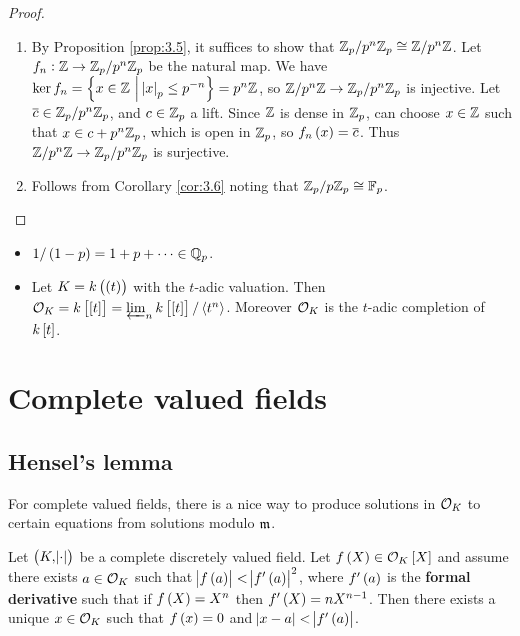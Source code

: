\begin{proof}
\hfill
\begin{enumerate}
\item By Proposition \ref{prop:3.5}, it suffices to show that $ \mathbb{Z}_p / p^n\mathbb{Z}_p \cong \mathbb{Z} / p^n\mathbb{Z} $. Let $ f_n : \mathbb{Z} \to \mathbb{Z}_p / p^n\mathbb{Z}_p $ be the natural map. We have $ \ker f_n = \cbr{x \in \ZZ \st \abs{x}_p \le p^{-n}} = p^n\ZZ $, so $ \mathbb{Z} / p^n\mathbb{Z} \to \mathbb{Z}_p / p^n\mathbb{Z}_p $ is injective. Let $ \overline{c} \in \mathbb{Z}_p / p^n\mathbb{Z}_p $, and $ c \in \mathbb{Z}_p $ a lift. Since $ \mathbb{Z} $ is dense in $ \mathbb{Z}_p $, can choose $ x \in \mathbb{Z} $ such that $ x \in c + p^n\mathbb{Z}_p $, which is open in $ \mathbb{Z}_p $, so $ f_n\br{x} = \overline{c} $. Thus $ \mathbb{Z} / p^n\mathbb{Z} \to \mathbb{Z}_p / p^n\mathbb{Z}_p $ is surjective.
\item Follows from Corollary \ref{cor:3.6} noting that $ \mathbb{Z}_p / p\mathbb{Z}_p \cong \mathbb{F}_p $.
\end{enumerate}
\end{proof}

\begin{example*}
\hfill
\begin{itemize}
\item $ 1 / \br{1 - p} = 1 + p + \dots \in \QQ_p $.
\item Let $ K = k\br{\br{t}} $ with the $ t $-adic valuation. Then $ \OOO_K = k\sbr{\sbr{t}} = \varprojlim_n k\sbr{\sbr{t}} / \abr{t^n} $. Moreover $ \mathcal{O}_K $ is the $ t $-adic completion of $ k\sbr{t} $.
\end{itemize}
\end{example*}

\pagebreak

\section{Complete valued fields}

\subsection{Hensel's lemma}


For complete valued fields, there is a nice way to produce solutions in $ \mathcal{O}_K $ to certain equations from solutions modulo $ \mathfrak{m} $.

\begin{theorem}
\label{thm:4.1}
Let $ \br{K, \abs{\cdot}} $ be a complete discretely valued field. Let $ f\br{X} \in \OOO_K\sbr{X} $ and assume there exists $ a \in \mathcal{O}_K $ such that $ \abs{f\br{a}} < \abs{f'\br{a}}^2 $, where $ f'\br{a} $ is the \textbf{formal derivative} such that if $ f\br{X} = X^n $ then $ f'\br{X} = nX^{n - 1} $. Then there exists a unique $ x \in \mathcal{O}_K $ such that $ f\br{x} = 0 $ and $ \abs{x - a} < \abs{f'\br{a}} $.
\end{theorem}


